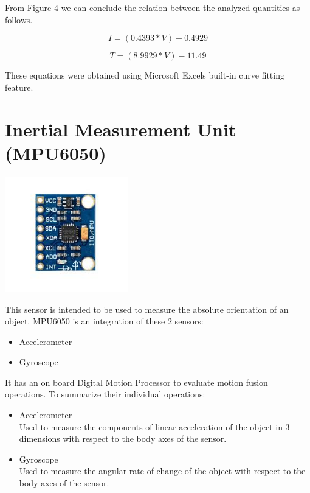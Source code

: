 \documentclass[9pt]{article}
\begin{document}
From Figure $4$ we can conclude the relation between the analyzed quantities as follows.

\begin{equation}
I = (0.4393 * V) - 0.4929
\end{equation}

\begin{equation}
T = (8.9929 * V) - 11.49
\end{equation}
 
These equations were obtained using Microsoft Excels built-in curve fitting feature.  

\section{Inertial Measurement Unit (MPU6050)}

\begin{center}
\includegraphics[width=0.4\textwidth]{5.jpg}
\end{center}

\noindent This sensor is intended to be used to measure the absolute orientation of an object. MPU6050 is an integration of these $2$ sensors:
\begin{itemize}
\item Accelerometer
\item Gyroscope
\end{itemize}
 
\noindent It has an on board Digital Motion Processor to evaluate motion fusion operations. To summarize their individual operations:

\begin{itemize}

\item Accelerometer\\
Used to measure the components of linear acceleration of the object in $3$ dimensions with respect to the body axes of the sensor.

\item Gyroscope\\
Used to measure the angular rate of change of the object with respect to the body axes of the sensor.

\end{itemize}
\end{document}
